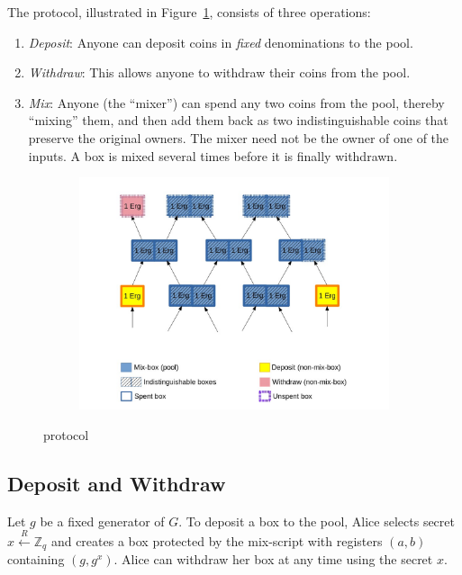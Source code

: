 \documentclass[runningheads]{llncs}
\newcommand{\rand}{\stackrel{R}{\leftarrow}}
\begin{document}
The protocol, illustrated in Figure~\ref{fig:sigmajoin}, consists of three operations:

\begin{enumerate}
    \item {\em Deposit}: Anyone can deposit coins in {\em fixed} denominations to the pool.
    \item {\em Withdraw}: This allows anyone to withdraw their coins from the pool.
    \item {\em Mix}: Anyone (the ``mixer'') can spend any two coins from the pool, thereby ``mixing'' them, and then add them back as two indistinguishable coins that preserve the original owners. The mixer need not be the owner of one of the inputs.
    A box is mixed several times before it is finally withdrawn.
\end{enumerate}

\begin{figure}[h]
    \centering
    \begin{subfigure}{.8\textwidth}
        \centering
        \includegraphics[width=\linewidth]{Sigmajoin.jpg}
    \end{subfigure}%
    \caption{\algname protocol}
    \label{fig:sigmajoin}
\end{figure}

\subsection{Deposit and Withdraw}

Let $g$ be a fixed generator of $G$. To deposit a box to the pool, Alice selects secret $x\rand \mathbb{Z}_q$ and creates a box protected by the mix-script with registers $(a, b)$ containing $(g, g^x)$. Alice can withdraw her box at any time using the secret $x$.
\end{document}
